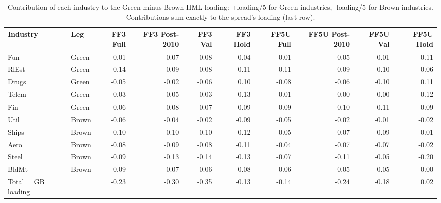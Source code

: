 \begin{table}
\caption{Contribution of each industry to the Green-minus-Brown HML loading: +loading/5 for Green industries, -loading/5 for Brown industries. Contributions sum exactly to the spread's loading (last row).}
\label{tab:m2_hml_contrib}
\begin{tabular}{llrrrrrrrr}
\toprule
Industry & Leg & FF3 Full & FF3 Post-2010 & FF3 Val & FF3 Hold & FF5U Full & FF5U Post-2010 & FF5U Val & FF5U Hold \\
\midrule
Fun & Green & 0.01 & -0.07 & -0.08 & -0.04 & -0.01 & -0.05 & -0.01 & -0.11 \\
RlEst & Green & 0.14 & 0.09 & 0.08 & 0.11 & 0.11 & 0.09 & 0.10 & 0.06 \\
Drugs & Green & -0.05 & -0.02 & -0.06 & 0.10 & -0.08 & -0.06 & -0.10 & 0.11 \\
Telcm & Green & 0.03 & 0.05 & 0.03 & 0.13 & 0.01 & 0.00 & 0.00 & 0.12 \\
Fin & Green & 0.06 & 0.08 & 0.07 & 0.09 & 0.09 & 0.10 & 0.11 & 0.09 \\
Util & Brown & -0.06 & -0.04 & -0.02 & -0.09 & -0.05 & -0.02 & -0.01 & -0.02 \\
Ships & Brown & -0.10 & -0.10 & -0.10 & -0.12 & -0.05 & -0.07 & -0.09 & -0.01 \\
Aero & Brown & -0.08 & -0.09 & -0.08 & -0.11 & -0.04 & -0.07 & -0.07 & -0.02 \\
Steel & Brown & -0.09 & -0.13 & -0.14 & -0.13 & -0.07 & -0.11 & -0.05 & -0.20 \\
BldMt & Brown & -0.09 & -0.07 & -0.06 & -0.08 & -0.06 & -0.05 & -0.05 & 0.00 \\
Total = GB loading &  & -0.23 & -0.30 & -0.35 & -0.13 & -0.14 & -0.24 & -0.18 & 0.02 \\
\bottomrule
\end{tabular}
\end{table}
